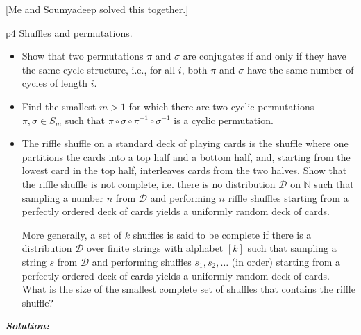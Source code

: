 \documentclass[a4paper, 11pt]{article}
\newcounter{problem}
\begin{document}
[Me and Soumyadeep solved this together.]\parinn



\begin{problem}{%
	}{p4%
	}
Shuffles and permutations.
\begin{itemize}[label=$\bullet$]
	\item Show that two permutations $\pi$ and $\sigma$ are conjugates if and only if they have the same cycle structure, i.e., for all $i$, both $\pi$ and $\sigma$ have the same number of cycles of length $i$.
\item Find the smallest $m>1$ for which there are two cyclic permutations $\pi, \sigma \in S_m$ such that $\pi \circ \sigma \circ \pi^{-1} \circ \sigma^{-1}$ is a cyclic permutation.
\item The riffle shuffle on a standard deck of playing cards is the shuffle where one partitions the cards into a top half and a bottom half, and, starting from the
lowest card in the top half, interleaves cards from the two halves. Show that the riffle shuffle is not complete, i.e. there is no distribution $\mathcal{D}$ on $\mathbb{N}$ such that sampling a number $n$ from $\mathcal{D}$ and performing $n$ riffle shuffles starting from a perfectly ordered deck of cards yields a uniformly random deck of cards.

More generally, a set of $k$ shuffles is said to be complete if there is a distribution $\mathcal{D}$ over finite strings with alphabet $[k]$ such that sampling a string $s$ from $\mathcal{D}$ and performing shuffles $s_1, s_2, \ldots$ (in order) starting from a perfectly ordered deck of cards yields a uniformly random deck of cards. What is the size of the smallest complete set of shuffles that contains the riffle shuffle?
\end{itemize}
\end{problem}\parinf
\textit{\textbf{Solution:}}\parinn
\end{document}
